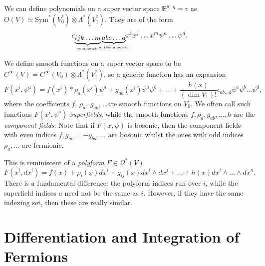 
\begin{definition}[polynomials]
  We can define polynomials on a super vector space $\mathbb{R}^{p \mid q} = v$ as $O(V) \simeq \text{Sym}^*(V^*_0) \otimes \Lambda^* (V_1^*)$. They are of the form
  \begin{equation}
    c_{\underbrace{ijk \dots m}_{\mathclap{\text{symmetric}}} \underbrace{abc \dots d}_{\mathclap{\text{antisymmetric}}}} x^{i} x^{j} \dots x^{m} \psi^{a} \dots \psi^{d}.
  \end{equation}
\end{definition}
\begin{definition}
  We define smooth functions on a super vector space to be $C^\infty(V) = C^\infty(V_0) \otimes \Lambda^* (V_1^*)$, so a generic function has an expansion
  \begin{equation}
    F(x^{i}, \psi^{a}) = f(x^{i}) * \rho_a (x^{i}) \psi^{a} + g_{ab} (x^{i}) \psi^{a} \psi^{b} + \dots + \frac{h(x)}{(\dim V_1)!} \epsilon_{ab \dots d} \psi^{a} \psi^{b} \dots \psi^{d},
  \end{equation}
  where the coefficients $f$, $\rho_{a}$, $g_{ab}$, \dots are smooth functions on $V_0$. We often call such functions $F(x^{i}, \psi^{a})$ \emph{superfields}, while the smooth functions $f, \rho_a, g_{ab}, \dots, h$ are the \emph{component fields}.
  Note that if $F(x, \psi)$ is bosonic, then the component fields with even indices $f, g_{ab}=-g_{ba}, \dots$ are bosonic whilst the ones with odd indices $\rho_a, \dots$ are fermionic.
\end{definition}
\begin{remark}
  This is reminiscent of a \emph{polyform} $F\in \Omega^*(V)$
  \begin{equation}
    F(x^{i}, dx^{i}) = f(x) + \rho_i(x) dx^{i} + g_{ij} (x) dx^{i} \wedge dx^{j} + \dots + h(x) dx^{i} \wedge \dots \wedge dx^{n}.
  \end{equation}
  There is a fundamental difference: the polyform indices run over $i$, while the superfield indices $a$ need not be the same as $i$. However, if they have the same indexing set, then these are really similar.
\end{remark}

\section{Differentiation and Integration of Fermions}%
\label{sec:differentiation_and_integration_of_fermions}

